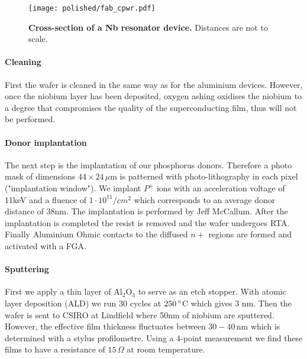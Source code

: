 \begin{figure}
	\centering
	\texttt{[image: polished/fab\_cpwr.pdf]}
	\caption[Cross-section of a Nb resonator device]{\textbf{Cross-section of a Nb resonator device.} Distances are not to scale. }
	\label{fig:fab_cpwr}
\end{figure}

\paragraph*{Cleaning} 
First the wafer is cleaned in the same way as for the aluminium devices. However, once the niobium layer has been deposited, oxygen ashing oxidises the niobium to a degree that compromises the quality of the superconducting film, thus will not be performed.

\paragraph*{Donor implantation}
The next step is the implantation of our phosphorus donors. Therefore a photo mask of dimensions  $44\times24\,\mu$m is patterned with photo-lithography in each pixel ("implantation window"). We implant $P^+$ ions with an acceleration voltage of 11keV and a fluence of $1\cdot 10^{11}/cm^2$ which corresponds to an average donor distance of 38nm. The implantation is performed by Jeff McCallum. After the implantation is completed the resist is removed and the wafer undergoes RTA. Finally Aluminium Ohmic contacts to the diffused $n+$ regions are formed and activated with a FGA.

\paragraph*{Sputtering}
First we apply a thin layer of Al$_2$O$_3$ to serve as an etch stopper. With atomic layer deposition (ALD) we run 30 cycles at $250\,\degree$C which gives 3 nm. 
Then the wafer is sent to CSIRO at Lindfield where 50nm of niobium are sputtered. However, the effective film thickness fluctuates between $30-40\,$nm which is determined with a stylus profilometre. Using a 4-point measurement we find these films to have a resistance of $15\,\Omega$ at room temperature. 

